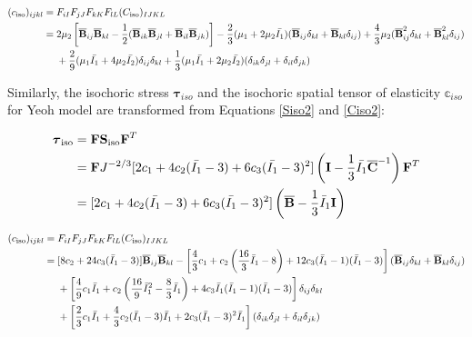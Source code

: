 \begin{appendices}
\begin{equation} \label{spatial_ciso1}
\begin{split}
(c_\mathrm{iso})_{ijkl} = {}&  F_{iI}F_{jJ}F_{kK}F_{lL}(C_\mathrm{iso})_{IJKL} \\
= {} &
2\mu_2 \left[{\overline{\bold{B}}}_{ij} {\overline{\bold{B}}}_{kl} - \frac{1}{2}({\overline{\bold{B}}}_{ik}{\overline{\bold{B}}}_{jl} + {\overline{\bold{B}}}_{il}{\overline{\bold{B}}}_{jk}) \right] 
- \frac{2}{3}(\mu_1 + 2\mu_2\bar{I_1})({\overline{\bold{B}}}_{ij}\delta_{kl} + {\overline{\bold{B}}}_{kl}\delta_{ij}) 
+ \frac{4}{3}\mu_2({\overline{\bold{B}}}^2_{ij}\delta_{kl} + {\overline{\bold{B}}}^2_{kl}\delta_{ij}) \\
&+
\frac{2}{9}(\mu_1\bar{I_1} + 4\mu_2\bar{I_2}) \delta_{ij}\delta_{kl}
+ \frac{1}{3}(\mu_1\bar{I_1} + 2\mu_2\bar{I_2})(\delta_{ik}\delta_{jl} + \delta_{il}\delta_{jk})
\end{split}
\end{equation} 

Similarly, the isochoric stress $\boldsymbol{\tau}_{iso}$ and the isochoric spatial tensor of elasticity $\mathbb{c}_{iso}$ for Yeoh model are transformed from Equations \ref{Siso2} and \ref{Ciso2}:

\begin{equation} \label{Tauiso2}
\begin{split}
\boldsymbol{\tau}_\mathrm{iso} 
&= \bold{F}\bold{S}_\mathrm{iso}{\bold{F}}^T \\
&= \bold{F}  J^{-2/3}[2c_1 + 4c_2(\bar{I_1} - 3) + 6c_3(\bar{I_1} - 3)^2] \left(\bold{I} - \frac{1}{3}\bar{I_1}{\overline{\bold{C}}}^{-1} \right)  \bold{F}^T \\
&= [2c_1 + 4c_2(\bar{I_1} - 3) + 6c_3(\bar{I_1} - 3)^2] \left(\overline{\bold{B}} - \frac{1}{3}\bar{I}_1\bold{I} \right)
\end{split}
\end{equation}

\begin{equation} \label{spatial_ciso2}
\begin{split}
(c_\mathrm{iso})_{ijkl} = {} &  F_{iI}F_{jJ}F_{kK}F_{lL}(C_\mathrm{iso})_{IJKL} \\
= {}& 
[8c_2+24c_3({\bar{I}}_1 - 3)] {\overline{\bold{B}}}_{ij}{\overline{\bold{B}}}_{kl} 
- \left[\frac{4}{3}c_1 + c_2\left(\frac{16}{3}{\bar{I}}_1 - 8\right) + 12c_3({\bar{I}}_1 - 1)({\bar{I}}_1 - 3)\right]({\overline{\bold{B}}}_{ij}\delta_{kl} + {\overline{\bold{B}}}_{kl}\delta_{ij}) \\
&+ \left[\frac{4}{9}c_1{\bar{I}}_1 + c_2\left(\frac{16}{9}{{\bar{I}}_1}^2 - \frac{8}{3}{\bar{I}}_1\right) + 4c_3{\bar{I}}_1({\bar{I}}_1 - 1)({\bar{I}}_1 - 3)\right] \delta_{ij}\delta_{kl} \\
&+ \left[\frac{2}{3}c_1{\bar{I}}_1 + \frac{4}{3}c_2({\bar{I}}_1 - 3){\bar{I}}_1 + 2c_3({\bar{I}}_1 - 3)^2{\bar{I}}_1\right](\delta_{ik}\delta_{jl} + \delta_{il}\delta_{jk})
\end{split}
\end{equation} 


\end{appendices}
